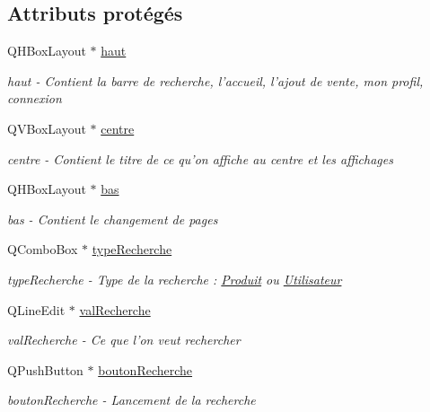 \subsection*{Attributs protégés}
\begin{DoxyCompactItemize}
\item 
Q\-H\-Box\-Layout $\ast$ \hyperlink{class_ma_fenetre_acd485d3f85c155925df773f028f9e537}{haut}
\begin{DoxyCompactList}\small\item\em haut -\/ Contient la barre de recherche, l'accueil, l'ajout de vente, mon profil, connexion \end{DoxyCompactList}\item 
Q\-V\-Box\-Layout $\ast$ \hyperlink{class_ma_fenetre_aefa40adcb6099816353c31ea230ec1af}{centre}
\begin{DoxyCompactList}\small\item\em centre -\/ Contient le titre de ce qu'on affiche au centre et les affichages \end{DoxyCompactList}\item 
Q\-H\-Box\-Layout $\ast$ \hyperlink{class_ma_fenetre_aff3315e53711db117feadab319660cee}{bas}
\begin{DoxyCompactList}\small\item\em bas -\/ Contient le changement de pages \end{DoxyCompactList}\item 
Q\-Combo\-Box $\ast$ \hyperlink{class_ma_fenetre_a3df6a320b8835369da88bf94b701ae76}{type\-Recherche}
\begin{DoxyCompactList}\small\item\em type\-Recherche -\/ Type de la recherche \-: \hyperlink{class_produit}{Produit} ou \hyperlink{class_utilisateur}{Utilisateur} \end{DoxyCompactList}\item 
Q\-Line\-Edit $\ast$ \hyperlink{class_ma_fenetre_a37836681a6d48a32dcd379b11447f579}{val\-Recherche}
\begin{DoxyCompactList}\small\item\em val\-Recherche -\/ Ce que l'on veut rechercher \end{DoxyCompactList}\item 
Q\-Push\-Button $\ast$ \hyperlink{class_ma_fenetre_afe6e47d40e487fccd18d4bcc3c57e64e}{bouton\-Recherche}
\begin{DoxyCompactList}\small\item\em bouton\-Recherche -\/ Lancement de la recherche \end{DoxyCompactList}\item 

\end{DoxyCompactItemize}
